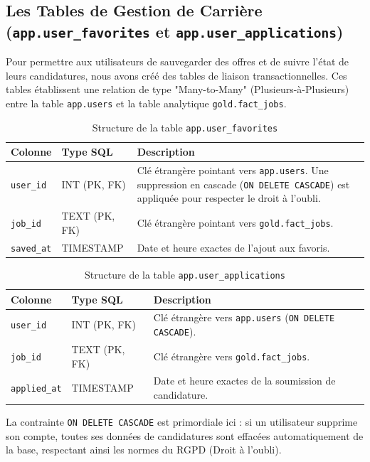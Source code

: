 \documentclass[12pt,a4paper,twoside]{report}
\begin{document}
\subsection{Les Tables de Gestion de Carrière (\texttt{app.user\_favorites} et \texttt{app.user\_applications})}
Pour permettre aux utilisateurs de sauvegarder des offres et de suivre l'état de leurs candidatures, nous avons créé des tables de liaison transactionnelles. Ces tables établissent une relation de type "Many-to-Many" (Plusieurs-à-Plusieurs) entre la table \texttt{app.users} et la table analytique \texttt{gold.fact\_jobs}.

\begin{table}[H]
    \centering
    \begin{tabularx}{\textwidth}{|l|l|X|}
        \hline
        \textbf{Colonne} & \textbf{Type SQL} & \textbf{Description} \\
        \hline
        \texttt{user\_id} & INT (PK, FK) & Clé étrangère pointant vers \texttt{app.users}. Une suppression en cascade (\texttt{ON DELETE CASCADE}) est appliquée pour respecter le droit à l'oubli. \\
        \texttt{job\_id} & TEXT (PK, FK) & Clé étrangère pointant vers \texttt{gold.fact\_jobs}. \\
        \texttt{saved\_at} & TIMESTAMP & Date et heure exactes de l'ajout aux favoris. \\
        \hline
    \end{tabularx}
    \caption{Structure de la table \texttt{app.user\_favorites}}
\end{table}

\begin{table}[H]
    \centering
    \begin{tabularx}{\textwidth}{|l|l|X|}
        \hline
        \textbf{Colonne} & \textbf{Type SQL} & \textbf{Description} \\
        \hline
        \texttt{user\_id} & INT (PK, FK) & Clé étrangère vers \texttt{app.users} (\texttt{ON DELETE CASCADE}). \\
        \texttt{job\_id} & TEXT (PK, FK) & Clé étrangère vers \texttt{gold.fact\_jobs}. \\
        \texttt{applied\_at} & TIMESTAMP & Date et heure exactes de la soumission de candidature. \\
        \hline
    \end{tabularx}
    \caption{Structure de la table \texttt{app.user\_applications}}
\end{table}
La contrainte \texttt{ON DELETE CASCADE} est primordiale ici : si un utilisateur supprime son compte, toutes ses données de candidatures sont effacées automatiquement de la base, respectant ainsi les normes du RGPD (Droit à l'oubli).
\end{document}
